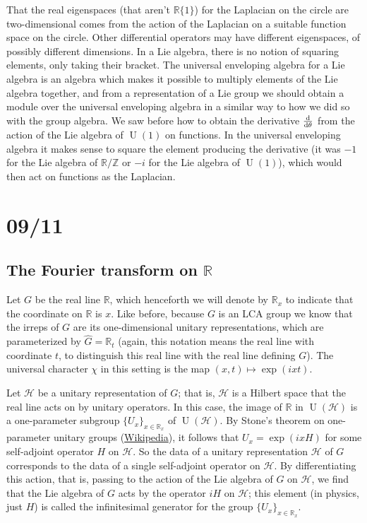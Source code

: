\documentclass[11pt,leqno]{article}
\theoremstyle{plain}
\theoremstyle{definition}
\numberwithin{equation}{section}
\numberwithin{lem}{section}
\DeclareMathOperator{\U}{U}
\begin{document}
That the real eigenspaces (that aren't $\mathbb R\{1\}$) for the Laplacian on the circle are two-dimensional comes from the action of the Laplacian on a suitable function space on the circle. Other differential operators may have different eigenspaces, of possibly different dimensions. In a Lie algebra, there is no notion of squaring elements, only taking their bracket. The universal enveloping algebra for a Lie algebra is an algebra which makes it possible to multiply elements of the Lie algebra together, and from a representation of a Lie group we should obtain a module over the universal enveloping algebra in a similar way to how we did so with the group algebra. We saw before how to obtain the derivative $\dv{\theta}$ from the action of the Lie algebra of $\U(1)$ on functions. In the universal enveloping algebra it makes sense to square the element producing the derivative (it was $-1$ for the Lie algebra of $\mathbb R/\mathbb Z$ or $-i$ for the Lie algebra of $\U(1)$), which would then act on functions as the Laplacian.

\newpage\section{09/11}
\subsection{The Fourier transform on $\mathbb R$}
Let $G$ be the real line $\mathbb R$, which henceforth we will denote by $\mathbb R_x$ to indicate that the coordinate on $\mathbb R$ is $x$. Like before, because $G$ is an LCA group we know that the irreps of $G$ are its one-dimensional unitary representations, which are parameterized by $\widehat G = \mathbb R_t$ (again, this notation means the real line with coordinate $t$, to distinguish this real line with the real line defining $G$). The universal character $\chi$ in this setting is the map $(x,t)\mapsto \exp(ixt)$. 

Let $\mathcal H$ be a unitary representation of $G$; that is, $\mathcal H$ is a Hilbert space that the real line acts on by unitary operators. In this case, the image of $\mathbb R$ in $\U(\mathcal H)$ is a one-parameter subgroup $\{U_x\}_{x\in\mathbb R_x}$ of $\U(\mathcal H)$. By Stone's theorem on one-parameter unitary groups (\href{https://en.wikipedia.org/wiki/Stone%27s_theorem_on_one-parameter_unitary_groups}{Wikipedia}), it follows that $U_x = \exp(ixH)$ for some self-adjoint operator $H$ on $\mathcal H$. So the data of a unitary representation $\mathcal H$ of $G$ corresponds to the data of a single self-adjoint operator on $\mathcal H$. By differentiating this action, that is, passing to the action of the Lie algebra of $G$ on $\mathcal H$, we find that the Lie algebra of $G$ acts by the operator $iH$ on $\mathcal H$; this element (in physics, just $H$) is called the infinitesimal generator for the group $\{U_x\}_{x\in\mathbb R_x}$.
\end{document}
